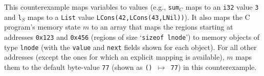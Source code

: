 

This counterexample maps variables to values (e.g., {\tt sum}$_C$ maps to an {\tt i32} value {\tt 3}
and {\tt l}$_S$ maps to a {\tt List} value {\tt LCons(42,LCons(43,LNil))}).
It also maps the C program's memory state $m$ to an array that
maps the regions starting at addresses {\tt 0x123} and {\tt 0x456} (regions of size
`{\tt sizeof lnode}') to memory objects of type {\tt lnode} (with the
{\tt value} and {\tt next} fields shown for each object). For all other addresses (except
the ones for which an explicit mapping is available), $m$ maps them
to the default byte-value {\tt 77} (shown
as {\tt () $\mapsto$ 77}) in this counterexample.

